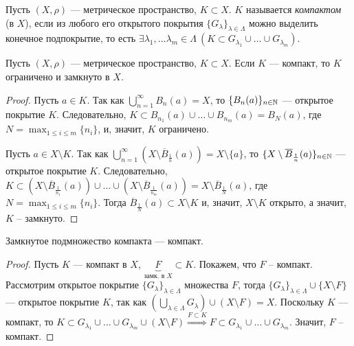 \begin{definition}
    Пусть $(X, \rho)$ --- метрическое пространство, $K \subset X$. $K$ называется \emph{компактом} (в $X$), если из любого его открытого покрытия $\{G_\lambda\}_{\lambda \in \Lambda}$ можно выделить конечное подпокрытие, то есть $\exists \lambda_1, \ldots \lambda_m \in \Lambda \ (K \subset G_{\lambda_1} \cup \ldots \cup G_{\lambda_m})$.
\end{definition}

\begin{lemma}
    \label{lem_lim_closed}
    Пусть $(X, \rho)$ --- метрическое пространство, $K \subset X$. Если $K$ --- компакт, то $K$ ограничено и замкнуто в $X$.

    \begin{proof}
        Пусть $a \in K$. Так как $\bigcup_{n = 1}^\infty B_n(a) = X$, то $\{B_n(a)\}_{n \in \mathbb{N}}$ --- открытое покрытие $K$. Следовательно, $K \subset B_{n_1}(a) \cup \ldots \cup B_{n_m}(a) = B_N(a)$, где $N = \max_{1 \le i \le m}\{n_i\}$, и, значит, $K$ ограничено.

        Пусть $a \in X \setminus K$. Так как $\bigcup_{n=1}^{\infty}\left(X \setminus \overline{B}_{\frac{1}{n}}(a)\right) = X \setminus \{a\}$, то $\{X \setminus \overline{B}_{\frac{1}{n}} (a)\}_{n \in \mathbb{N}}$ --- открытое покрытие $K$. Следовательно, $K \subset \left(X \setminus \overline{B}_{\frac{1}{n_1}}(a)\right) \cup \ldots \cup \left(X \setminus \overline{B}_{\frac{1}{n_m}}(a)\right) = X \setminus \overline{B}_{\frac{1}{N}}(a)$, где $N = \max_{1 \le i \le m}\{n_i\}$. Тогда $\overline{B}_{\frac{1}{N}}(a) \subset X \setminus K$ и, значит, $X \setminus K$ открыто, а значит, $K$ -- замкнуто.
    \end{proof}
\end{lemma}

\begin{lemma}
    \label{lem_comp_subset}
    Замкнутое подмножество компакта --- компакт.

    \begin{proof}
        Пусть $K$ --- компакт в $X$, $\underbrace{F}_{\text{замк. в $X$}} \subset K$. Покажем, что $F$ -- компакт. Рассмотрим открытое покрытие $\{G_\lambda\}_{\lambda \in \Lambda}$ множества $F$, тогда $\{G_{\lambda}\}_{\lambda \in \Lambda} \cup \{X \setminus F\}$ --- открытое покрытие $K$, так как $\left(\bigcup_{\lambda \in \Lambda} G_\lambda\right) \cup (X \setminus F) = X$. Поскольку $K$ --- компакт, то $K \subset G_{\lambda_1} \cup \ldots \cup G_{\lambda_m} \cup (X \setminus F) \overset{F \subset K}{\Rightarrow} F \subset G_{\lambda_1} \cup \ldots \cup G_{\lambda_m}$. Значит, $F$ -- компакт.
    \end{proof}
\end{lemma}

